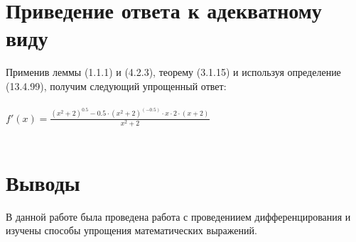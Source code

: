 \documentclass[a4paper,12pt]{article} %
\begin{document}
\section{Приведение ответа к адекватному виду}

Применив леммы (1.1.1) и (4.2.3), теорему (3.1.15) и используя определение (13.4.99), получим следующий упрощенный ответ:\\ 
 \hspace{1cm}\\ 
 

$ f'(x) =  \frac{  {\left( {x} ^ {{2}} + {2} \right)}  ^ {{0.5}} - {0.5} \cdot  {\left( {x} ^ {{2}} + {2} \right)}  ^ {{\left(-0.5\right)}} \cdot {x} \cdot {2} \cdot  {\left( {x} + {2} \right)}  }{ {x} ^ {{2}} + {2} }  $\\ 
 \hspace{1cm}\\ 
 

\section{Выводы}

В данной работе была проведена работа с проведениием дифференцирования и изучены способы упрощения математических выражений.
\end{document}
